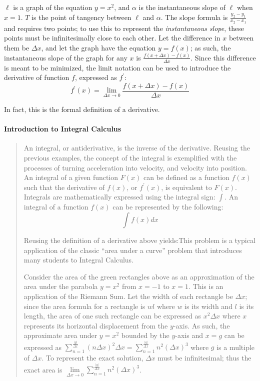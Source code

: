 \documentclass[letterpaper,12pt,twoside]{report}
\begin{document}
$\ell$ is a graph of the equation $y=x^2$, and $\alpha$ is the instantaneous slope of $\ell$ when $x=1$. $T$ is the point of tangency between $\ell$ and $\alpha$. The slope formula is $\frac{y_2-y_1}{x_2-x_1}$ and requires two points; to use this to represent the \textit{instantaneous slope}, these points must be infinitesimally close to each other. Let the difference in $x$ between them be $\Delta x$, and let the graph have the equation $y=f(x)$; as such, the instantaneous slope of the graph for any $x$ is $\frac{f(x+\Delta x)-f(x)}{\Delta x}$. Since this difference is meant to be minimized, the limit notation can be used to introduce the derivative of function $f$, expressed as $f^\prime$: $$f^\prime(x)=\lim_{\Delta x\to 0}\frac{f(x+\Delta x)-f(x)}{\Delta x}$$

In fact, this is the formal definition of a derivative.

	\paragraph{Introduction to Integral Calculus}
	\begin{quotation}
		An integral, or antiderivative, is the inverse of the derivative. Reusing the previous examples, the concept of the integral is exemplified with the processes of turning acceleration into velocity, and velocity into position. An integral of a given function $F(x)$ can be defined as a function $f(x)$ such that the derivative of $f(x)$, or $f^\prime(x)$, is equivalent to $F(x)$. Integrals are mathematically expressed using the integral sign: $\int$. An integral of a function $f(x)$ can be represented by the following: $$\int f(x)dx$$
		
		Reusing the definition of a derivative above yields:This problem is a typical application of the classic ``area under a curve'' problem that introduces many students to Integral Calculus.
		
		Consider the area of the {\color{green} green} rectangles above as an approximation of the area under the parabola $y=x^2$ from $x=-1$ to $x=1$. This is an application of the Riemann Sum. Let the width of each rectangle be $\Delta x$; since the area formula for a rectangle is $wl$ where $w$ is its width and $l$ is its length, the area of one such rectangle can be expressed as $x^2\Delta x$ where $x$ represents its horizontal displacement from the $y$-axis. As such, the approximate area under $y=x^2$ bounded by the $y$-axis and $x=g$ can be expressed as $\sum\limits_{n=1}^{\frac{|g|}{\Delta x}}(n\Delta x)^2\Delta x=\sum\limits_{n=1}^{\frac{|g|}{\Delta x}}n^2(\Delta x)^3$ where $g$ is a multiple of $\Delta x$. To represent the exact solution, $\Delta x$ must be infinitesimal; thus the exact area is $\lim\limits_{\Delta x \rightarrow 0}\sum\limits_{n=1}^{\frac{|g|}{\Delta x}}n^2(\Delta x)^3$.
	\end{quotation}
	
\end{document}
